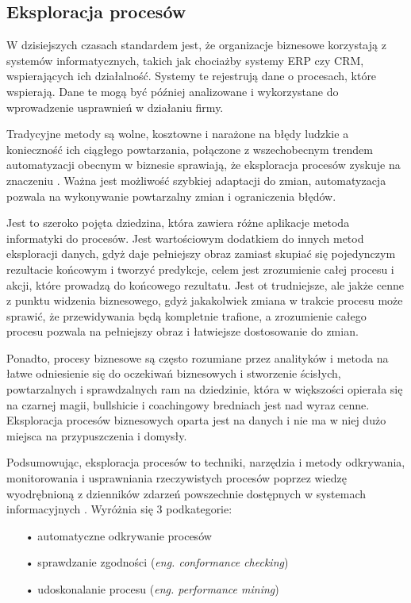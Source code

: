 \subsection{Eksploracja procesów}

W dzisiejszych czasach standardem jest, że organizacje biznesowe korzystają z systemów informatycznych, takich jak chociażby systemy ERP czy CRM, wspierających ich działalność. Systemy te rejestrują dane o procesach, które wspierają. Dane te mogą być później analizowane i wykorzystane do wprowadzenie usprawnień w działaniu firmy.   

Tradycyjne metody są wolne, kosztowne i narażone na błędy ludzkie a konieczność ich ciągłego powtarzania, połączone z wszechobecnym trendem automatyzacji obecnym w biznesie sprawiają, że eksploracja procesów zyskuje na znaczeniu \cite{market-pm}. Ważna jest możliwość szybkiej adaptacji do zmian, automatyzacja pozwala na wykonywanie powtarzalny zmian i ograniczenia błędów.

Jest to szeroko pojęta dziedzina, która zawiera różne aplikacje metoda informatyki do procesów. 
Jest wartościowym dodatkiem do innych metod eksploracji danych, gdyż daje pełniejszy obraz zamiast skupiać się pojedynczym rezultacie końcowym i tworzyć predykcje, celem jest zrozumienie całej procesu i akcji, które prowadzą do końcowego rezultatu. Jest ot trudniejsze, ale jakże cenne z punktu widzenia biznesowego, gdyż jakakolwiek zmiana w trakcie procesu może sprawić, że przewidywania będą kompletnie trafione, a zrozumienie całego procesu pozwala na pełniejszy obraz i łatwiejsze dostosowanie do zmian. 

Ponadto, procesy biznesowe są często rozumiane przez analityków i metoda na łatwe odniesienie się do oczekiwań biznesowych i stworzenie ścisłych, powtarzalnych i sprawdzalnych ram na dziedzinie, która w większości opierała się na czarnej magii, bullshicie i coachingowy bredniach jest nad wyraz cenne. Eksploracja procesów biznesowych oparta jest na danych i nie ma w niej dużo miejsca na przypuszczenia i domysły.

Podsumowując, eksploracja procesów to techniki, narzędzia i
metody odkrywania, monitorowania i
usprawniania rzeczywistych procesów poprzez 
wiedzę wyodrębnioną z dzienników zdarzeń powszechnie
dostępnych w systemach informacyjnych \cite{pm-manifesto}\cite{mining-overview}.
Wyróżnia się 3 podkategorie: 
\begin{itemize}
  \item[•] automatyczne odkrywanie procesów
  \item[•] sprawdzanie zgodności (\textit{eng. conformance checking})
  \item[•] udoskonalanie procesu (\textit{eng. performance mining})
\end{itemize}


